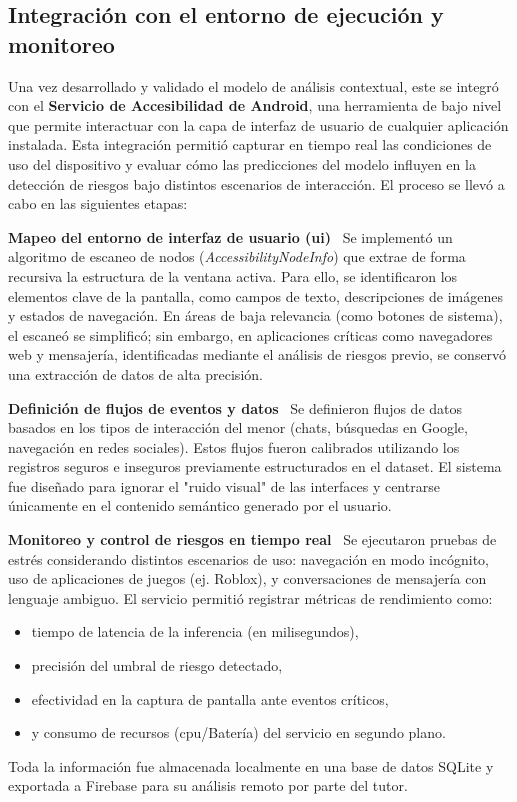 \subsection{Integración con el entorno de ejecución y monitoreo}
Una vez desarrollado y validado el modelo de análisis contextual, este se integró con el \textbf{Servicio de Accesibilidad de Android}, una herramienta de bajo nivel que permite interactuar con la capa de interfaz de usuario de cualquier aplicación instalada. Esta integración permitió capturar en tiempo real las condiciones de uso del dispositivo y evaluar cómo las predicciones del modelo influyen en la detección de riesgos bajo distintos escenarios de interacción. El proceso se llevó a cabo en las siguientes etapas: \

\textbf{Mapeo del entorno de interfaz de usuario (\gls{ui})} \
Se implementó un algoritmo de escaneo de nodos (\textit{AccessibilityNodeInfo}) que extrae de forma recursiva la estructura de la ventana activa. Para ello, se identificaron los elementos clave de la pantalla, como campos de texto, descripciones de imágenes y estados de navegación. En áreas de baja relevancia (como botones de sistema), el escaneó se simplificó; sin embargo, en aplicaciones críticas como navegadores web y mensajería, identificadas mediante el análisis de riesgos previo, se conservó una extracción de datos de alta precisión. \

\textbf{Definición de flujos de eventos y datos} \
Se definieron flujos de datos basados en los tipos de interacción del menor (chats, búsquedas en Google, navegación en redes sociales). Estos flujos fueron calibrados utilizando los registros seguros e inseguros previamente estructurados en el dataset. El sistema fue diseñado para ignorar el "ruido visual" de las interfaces y centrarse únicamente en el contenido semántico generado por el usuario. \

\textbf{Monitoreo y control de riesgos en tiempo real} \
Se ejecutaron pruebas de estrés considerando distintos escenarios de uso: navegación en modo incógnito, uso de aplicaciones de juegos (ej. Roblox), y conversaciones de mensajería con lenguaje ambiguo. El servicio permitió registrar métricas de rendimiento como:
\begin{itemize}
\item tiempo de latencia de la inferencia (en milisegundos),
\item precisión del umbral de riesgo detectado,
\item efectividad en la captura de pantalla ante eventos críticos,
\item y consumo de recursos (\gls{cpu}/Batería) del servicio en segundo plano.
\end{itemize}
Toda la información fue almacenada localmente en una base de datos SQLite y exportada a Firebase para su análisis remoto por parte del tutor. \

